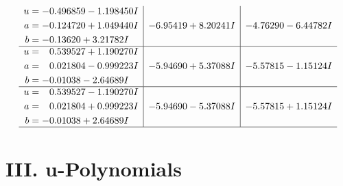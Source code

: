 \documentclass[1p]{elsarticle_modified}
\theoremstyle{definition}
\begin{document}
$$\begin{array}{c|c|c}
\begin{aligned}
u &= -0.496859 - 1.198450 I \\
a &= -0.124720 + 1.049440 I \\
b &= -0.13620 + 3.21782 I\end{aligned}
 & -6.95419 + 8.20241 I & -4.76290 - 6.44782 I \\ \hline\begin{aligned}
u &= \phantom{-}0.539527 + 1.190270 I \\
a &= \phantom{-}0.021804 - 0.999223 I \\
b &= -0.01038 - 2.64689 I\end{aligned}
 & -5.94690 + 5.37088 I & -5.57815 - 1.15124 I \\ \hline\begin{aligned}
u &= \phantom{-}0.539527 - 1.190270 I \\
a &= \phantom{-}0.021804 + 0.999223 I \\
b &= -0.01038 + 2.64689 I\end{aligned}
 & -5.94690 - 5.37088 I & -5.57815 + 1.15124 I\\
 \hline 
 \end{array}$$\newpage
\newpage\renewcommand{\arraystretch}{1}
\centering \section*{ III. u-Polynomials}
\end{document}
